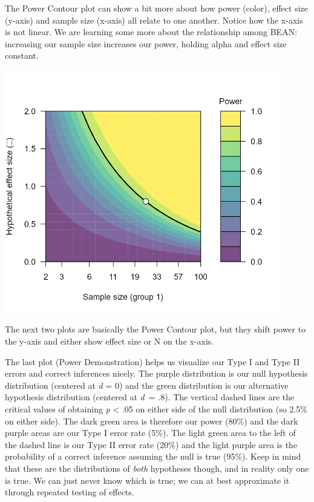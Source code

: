 \documentclass[
]{book}
\begin{document}
The Power Contour plot can show a bit more about how power (color), effect size (y-axis) and sample size (x-axis) all relate to one another. Notice how the x-axis is not linear. We are learning some more about the relationship among BEAN: increasing our sample size increases our power, holding alpha and effect size constant.

\includegraphics[width=4.76042in,height=\textheight]{images/05-bean/power-contour.png}

The next two plots are basically the Power Contour plot, but they shift power to the y-axis and either show effect size or N on the x-axis.

The last plot (Power Demonstration) helps us visualize our Type I and Type II errors and correct inferences nicely. The purple distribution is our null hypothesis distribution (centered at \emph{d} = 0) and the green distribution is our alternative hypothesis distribution (centered at \emph{d}~= .8). The vertical dashed lines are the critical values of obtaining \emph{p} \textless{} .05 on either side of the null distribution (so 2.5\% on either side). The dark green area is therefore our power (80\%) and the dark purple areas are our Type I error rate (5\%). The light green area to the left of the dashed line is our Type II error rate (20\%) and the light purple area is the probability of a correct inference assuming the null is true (95\%). Keep in mind that these are the distributions of \emph{both} hypotheses though, and in reality only one is true. We can just never know which is true; we can at best approximate it through repeated testing of effects.
\end{document}
